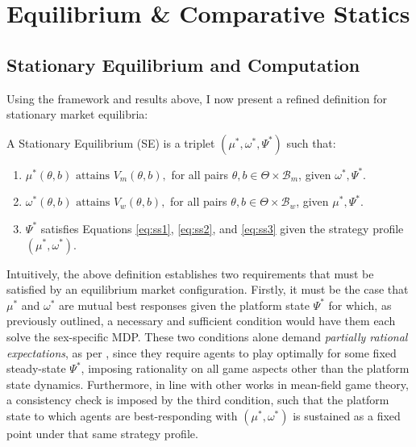 \section{Equilibrium \& Comparative Statics}
\label{sec:section3} 
\subsection{Stationary Equilibrium and Computation}\label{sec:section3.1} 
Using the framework and results above, I now present a refined definition for stationary market equilibria: 
\begin{definition}
    A Stationary Equilibrium (SE) is a triplet $(\mu^*, \omega^*, \Psi^*)$ such that:
    \begin{enumerate}
        \item $ \mu^*(\theta,b) \text{ attains } V_m(\theta,b),$ for all pairs $\theta, b \in \Theta \times \mathcal{B}_m$, given $\omega^*,\Psi^*$.
        \item $ \omega^*(\theta,b) \text{ attains } V_w(\theta,b),$ for all pairs $\theta, b \in \Theta \times \mathcal{B}_w$, given $\mu^*,\Psi^*$.
        \item $\Psi^*$ satisfies Equations \ref{eq:ss1}, \ref{eq:ss2}, and \ref{eq:ss3} given the strategy profile $(\mu^*, \omega^*)$.
    \end{enumerate} 
\end{definition}

Intuitively, the above definition establishes two requirements that must be satisfied by an equilibrium market configuration. 
Firstly, it must be the case that $\mu^*$ and $\omega^*$ are mutual best responses given the platform state $\Psi^*$ for which, as previously outlined, a necessary and sufficient condition would have them each solve the sex-specific MDP. 
These two conditions alone demand \textit{partially rational expectations}, as per \cite{burdett1997marriage}, since they require agents to play optimally for some fixed steady-state $\Psi^*$, imposing rationality on all game aspects other than the platform state dynamics. 
Furthermore, in line with other works in mean-field game theory, a consistency check is imposed by the third condition, such that the platform state to which agents are best-responding with $(\mu^*,\omega^*)$ is sustained as a fixed point under that same strategy profile.

